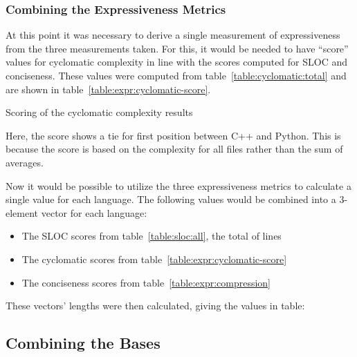 \subsubsection{Combining the Expressiveness Metrics}

At this point it was necessary to derive a single measurement of expressiveness from the three measurements taken. For this, it would be needed to have ``score'' values for cyclomatic complexity in line with the scores computed for SLOC and conciseness. These values were computed from table~\ref{table:cyclomatic:total} and are shown in table~\ref{table:expr:cyclomatic-score}.

\begin{table}[!htb]

\caption{Scoring of the cyclomatic complexity results}
\label{table:expr:cyclomatic-score}
\end{table}

Here, the score shows a tie for first position between C++ and Python. This is because the score is based on the complexity for all files rather than the sum of averages.

Now it would be possible to utilize the three expressiveness metrics to calculate a single value for each language. The following values would be combined into a 3-element vector for each language:

\begin{itemize}
\item The SLOC scores from table~\ref{table:sloc:all}, the total of lines
\item The cyclomatic scores from table~\ref{table:expr:cyclomatic-score}
\item The conciseness scores from table~\ref{table:expr:compression}
\end{itemize}

These vectors' lengths were then calculated, giving the values in table:

\subsection{Combining the Bases}
\label{subsec:combined}
